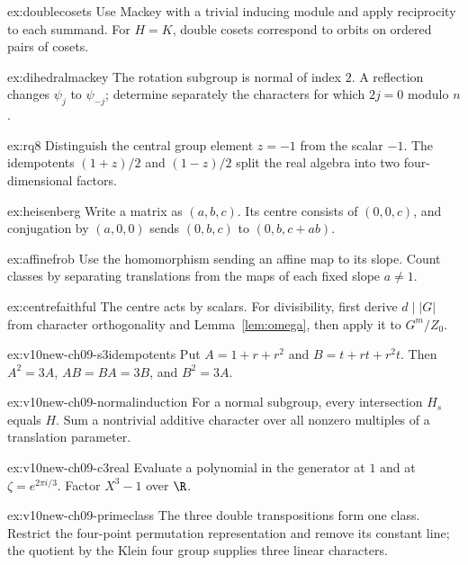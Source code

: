 \begin{hint}{ex:doublecosets}
Use Mackey with a trivial inducing module and apply reciprocity to each summand. For $H=K$, double cosets correspond to orbits on ordered pairs of cosets.
\end{hint}
\begin{hint}{ex:dihedralmackey}
The rotation subgroup is normal of index $2$. A reflection changes $\psi_j$ to $\psi_{-j}$; determine separately the characters for which $2j=0$ modulo $n$.
\end{hint}
\begin{hint}{ex:rq8}
Distinguish the central group element $z=-1$ from the scalar $-1$. The idempotents $(1+z)/2$ and $(1-z)/2$ split the real algebra into two four-dimensional factors.
\end{hint}
\begin{hint}{ex:heisenberg}
Write a matrix as $(a,b,c)$. Its centre consists of $(0,0,c)$, and conjugation by $(a,0,0)$ sends $(0,b,c)$ to $(0,b,c+ab)$.
\end{hint}
\begin{hint}{ex:affinefrob}
Use the homomorphism sending an affine map to its slope. Count classes by separating translations from the maps of each fixed slope $a\ne1$.
\end{hint}
\begin{hint}{ex:centrefaithful}
The centre acts by scalars. For divisibility, first derive $d\mid|G|$ from character orthogonality and Lemma~\ref{lem:omega}, then apply it to $G^m/Z_0$.
\end{hint}
\begin{hint}{ex:v10new-ch09-s3idempotents}
Put $A=1+r+r^2$ and $B=t+rt+r^2t$. Then $A^2=3A$, $AB=BA=3B$, and $B^2=3A$.
\end{hint}
\begin{hint}{ex:v10new-ch09-normalinduction}
For a normal subgroup, every intersection $H_s$ equals $H$. Sum a nontrivial additive character over all nonzero multiples of a translation parameter.
\end{hint}
\begin{hint}{ex:v10new-ch09-c3real}
Evaluate a polynomial in the generator at $1$ and at $\zeta=e^{2\pi i/3}$. Factor $X^3-1$ over $\R$.
\end{hint}
\begin{hint}{ex:v10new-ch09-primeclass}
The three double transpositions form one class. Restrict the four-point permutation representation and remove its constant line; the quotient by the Klein four group supplies three linear characters.
\end{hint}

